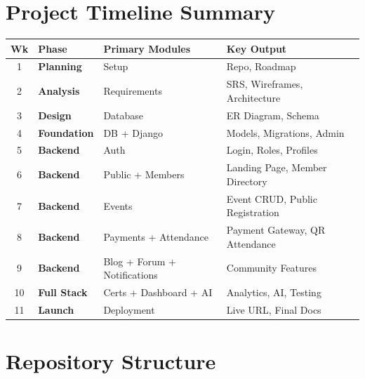 \documentclass[12pt,a4paper]{article}
\begin{document}
\section{Project Timeline Summary}

\renewcommand{\arraystretch}{1.5}
\begin{tabularx}{\textwidth}{c >{\bfseries}l l X}
\toprule
\textbf{Wk} & \textbf{Phase} & \textbf{Primary Modules} & \textbf{Key Output} \\
\midrule
1 & Planning    & Setup         & Repo, Roadmap \\
\rowcolor{rowgray}
2 & Analysis    & Requirements  & SRS, Wireframes, Architecture \\
3 & Design      & Database      & ER Diagram, Schema \\
\rowcolor{rowgray}
4 & Foundation  & DB + Django   & Models, Migrations, Admin \\
5 & Backend     & Auth          & Login, Roles, Profiles \\
\rowcolor{rowgray}
6 & Backend     & Public + Members & Landing Page, Member Directory \\
7 & Backend     & Events        & Event CRUD, Public Registration \\
\rowcolor{rowgray}
8 & Backend     & Payments + Attendance & Payment Gateway, QR Attendance \\
9 & Backend     & Blog + Forum + Notifications & Community Features \\
\rowcolor{rowgray}
10& Full Stack  & Certs + Dashboard + AI & Analytics, AI, Testing \\
11& Launch      & Deployment    & Live URL, Final Docs \\
\bottomrule
\end{tabularx}

\section{Repository Structure}
\end{document}
